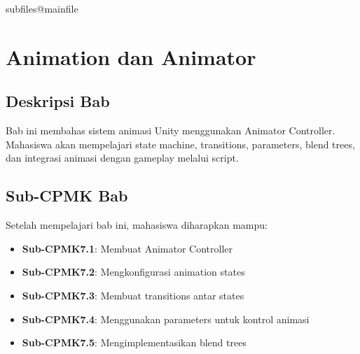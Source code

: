\documentclass[../../main.tex]{subfiles}
\begin{document}
\ifcsname subfiles@mainfile\endcsname\else
    \setcounter{chapter}{6}
\fi
\chapter{Animation dan Animator}

\section{Deskripsi Bab}

Bab ini membahas sistem animasi Unity menggunakan Animator Controller. Mahasiswa akan mempelajari state machine, transitions, parameters, blend trees, dan integrasi animasi dengan gameplay melalui script.

\section{Sub-CPMK Bab}

Setelah mempelajari bab ini, mahasiswa diharapkan mampu:
\begin{itemize}
\item \textbf{Sub-CPMK7.1}: Membuat Animator Controller
\item \textbf{Sub-CPMK7.2}: Mengkonfigurasi animation states
\item \textbf{Sub-CPMK7.3}: Membuat transitions antar states
\item \textbf{Sub-CPMK7.4}: Menggunakan parameters untuk kontrol animasi
\item \textbf{Sub-CPMK7.5}: Mengimplementasikan blend trees
\end{itemize}









\end{document}
